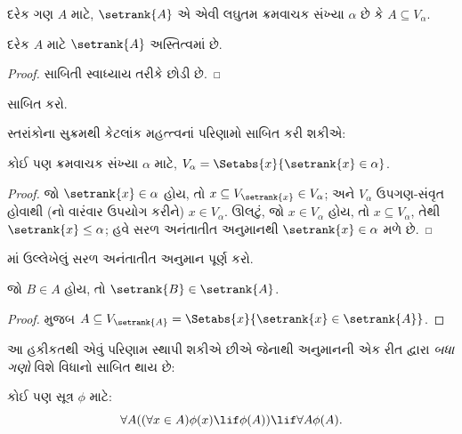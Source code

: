 \begin{defn}
દરેક ગણ $A$ માટે, $\setrank{A}$ એ એવી લઘુતમ ક્રમવાચક સંખ્યા
$\alpha$ છે કે $A
\subseteq V_\alpha$.
\end{defn}
\begin{prop}
	દરેક $A$ માટે $\setrank{A}$ અસ્તિત્વમાં છે.
\end{prop}
\begin{proof}
	સાબિતી સ્વાધ્યાય તરીકે છોડી છે.
\end{proof}
\begin{prob}
	 સાબિત કરો.
\end{prob}
\noindent 
સ્તરાંકોના સુક્રમથી કેટલાંક મહત્ત્વનાં પરિણામો સાબિત કરી શકીએ:
\begin{prop}
કોઈ પણ ક્રમવાચક સંખ્યા $\alpha$ માટે,
$V_\alpha = \Setabs{x}{\setrank{x} \in \alpha}$.
\end{prop}

\begin{proof}
જો $\setrank{x} \in \alpha$ હોય, તો $x \subseteq V_{\setrank{x}} \in
V_\alpha$; અને $V_\alpha$ ઉપગણ-સંવૃત હોવાથી
(નો વારંવાર ઉપયોગ કરીને)
$x \in V_\alpha$. ઊલટું, જો $x \in V_\alpha$ હોય, તો
$x \subseteq V_\alpha$, તેથી $\setrank{x} \leq \alpha$;
હવે સરળ અનંતાતીત અનુમાનથી $\setrank{x} \in \alpha$ મળે છે.
\end{proof}
\begin{prob}
	માં ઉલ્લેખેલું
	સરળ અનંતાતીત અનુમાન પૂર્ણ કરો.
\end{prob}

\begin{prop}
જો $B \in A$ હોય, તો $\setrank{B} \in \setrank{A}$.
\end{prop}

\begin{proof}
 મુજબ
$A \subseteq V_{\setrank{A}} = \Setabs{x}{\setrank{x} \in
\setrank{A}}$.
\end{proof}
\noindent
આ હકીકતથી એવું પરિણામ સ્થાપી શકીએ છીએ જેનાથી અનુમાનની
એક રીત દ્વારા \emph{બધા ગણો} વિશે વિધાનો સાબિત થાય છે:

\begin{thm}[$\in$-અનુમાનનું પ્રરૂપ] 
કોઈ પણ સૂત્ર $\phi$ માટે:
\[
	\forall A((\forall x \in A)\phi(x) \lif \phi(A)) \lif \forall A \phi(A).
\]
\end{thm}

